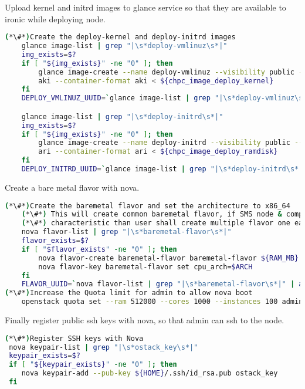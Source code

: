 Upload kernel and initrd images to glance service so that they are available to ironic while deploying node.

\begin{lstlisting}[language=bash,keywords={}]
(*\#*)Create the deploy-kernel and deploy-initrd images
    glance image-list | grep "|\s*deploy-vmlinuz\s*|"
    img_exists=$?
    if [ "${img_exists}" -ne "0" ]; then
        glance image-create --name deploy-vmlinuz --visibility public --disk-format \
        aki --container-format aki < ${chpc_image_deploy_kernel}
    fi
    DEPLOY_VMLINUZ_UUID=`glance image-list | grep "|\s*deploy-vmlinuz\s*|" | awk '{print $2}'`

    glance image-list | grep "|\s*deploy-initrd\s*|"
    img_exists=$?
    if [ "${img_exists}" -ne "0" ]; then
        glance image-create --name deploy-initrd --visibility public --disk-format \
        ari --container-format ari < ${chpc_image_deploy_ramdisk}
    fi
    DEPLOY_INITRD_UUID=`glance image-list | grep "|\s*deploy-initrd\s*|" | awk '{print $2}
\end{lstlisting}

Create a bare metal flavor with nova.

\begin{lstlisting}[language=bash,keywords={}]
(*\#*)Create the baremetal flavor and set the architecture to x86_64
    (*\#*) This will create common baremetal flavor, if SMS node & compute has different
    (*\#*) characteristic than user shall create multiple flavor one each characterisitc
    nova flavor-list | grep "|\s*baremetal-flavor\s*|"
    flavor_exists=$?
    if [ "$flavor_exists" -ne "0" ]; then
        nova flavor-create baremetal-flavor baremetal-flavor ${RAM_MB} ${DISK_GB} ${CPU}
        nova flavor-key baremetal-flavor set cpu_arch=$ARCH
    fi
    FLAVOR_UUID=`nova flavor-list | grep "|\s*baremetal-flavor\s*|" | awk '{print $2}'`
(*\#*)Increase the Quota limit for admin to allow nova boot
    openstack quota set --ram 512000 --cores 1000 --instances 100 admin
\end{lstlisting}

Finally register public ssh keys with nova, so that admin can ssh to the node.

\begin{lstlisting}[language=bash,keywords={}]
(*\#*)Register SSH keys with Nova
 nova keypair-list | grep "|\s*ostack_key\s*|"
 keypair_exists=$?
 if [ "${keypair_exists}" -ne "0" ]; then
    nova keypair-add --pub-key ${HOME}/.ssh/id_rsa.pub ostack_key
 fi
\end{lstlisting}

